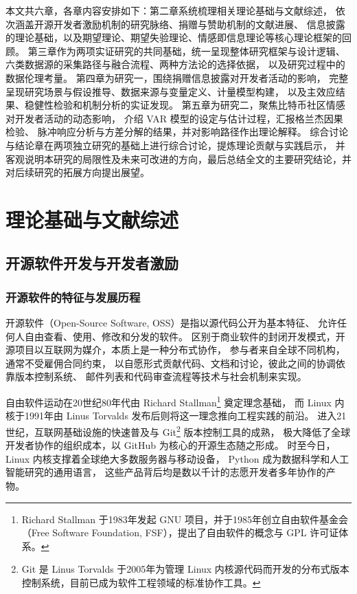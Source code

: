 \documentclass[
    type = master, %
    degree = professional,        %
    decl-page,  %
    twoside,                %
    fontset = fandol %
  ]{njuthesis}
\begin{document}
本文共六章，各章内容安排如下：第二章系统梳理相关理论基础与文献综述，
依次涵盖开源开发者激励机制的研究脉络、捐赠与赞助机制的文献进展、
信息披露的理论基础，以及期望理论、期望失验理论、情感即信息理论等核心理论框架的回顾。
第三章作为两项实证研究的共同基础，统一呈现整体研究框架与设计逻辑、
六类数据源的采集路径与融合流程、两种方法论的选择依据，
以及研究过程中的数据伦理考量。
第四章为研究一，围绕捐赠信息披露对开发者活动的影响，
完整呈现研究场景与假设推导、数据来源与变量定义、计量模型构建，
以及主效应结果、稳健性检验和机制分析的实证发现。
第五章为研究二，聚焦比特币社区情感对开发者活动的动态影响，
介绍 VAR 模型的设定与估计过程，汇报格兰杰因果检验、
脉冲响应分析与方差分解的结果，并对影响路径作出理论解释。
综合讨论与结论章在两项独立研究的基础上进行综合讨论，提炼理论贡献与实践启示，
并客观说明本研究的局限性及未来可改进的方向，最后总结全文的主要研究结论，并对后续研究的拓展方向提出展望。


\chapter{理论基础与文献综述}

\section{开源软件开发与开发者激励}

\subsection{开源软件的特征与发展历程}

开源软件（Open-Source Software, OSS）是指以源代码公开为基本特征、
允许任何人自由查看、使用、修改和分发的软件\cite{lakhani2003open}。
区别于商业软件的封闭开发模式，开源项目以互联网为媒介，本质上是一种分布式协作，
参与者来自全球不同机构，通常不受雇佣合同约束，
以自愿形式贡献代码、文档和讨论，彼此之间的协调依靠版本控制系统、
邮件列表和代码审查流程等技术与社会机制来实现。

自由软件运动在20世纪80年代由 Richard Stallman\footnote{Richard Stallman 于1983年发起 GNU 项目，并于1985年创立自由软件基金会（Free Software Foundation, FSF），提出了自由软件的概念与 GPL 许可证体系。} 奠定理念基础，
而 Linux 内核于1991年由 Linus Torvalds 发布后则将这一理念推向工程实践的前沿。
进入21世纪，互联网基础设施的快速普及与 Git\footnote{Git 是 Linus Torvalds 于2005年为管理 Linux 内核源代码而开发的分布式版本控制系统，目前已成为软件工程领域的标准协作工具。} 版本控制工具的成熟，
极大降低了全球开发者协作的组织成本，以 GitHub 为核心的开源生态随之形成。
时至今日，Linux 内核支撑着全球绝大多数服务器与移动设备，
Python 成为数据科学和人工智能研究的通用语言，
这些产品背后均是数以千计的志愿开发者多年协作的产物。
\end{document}
